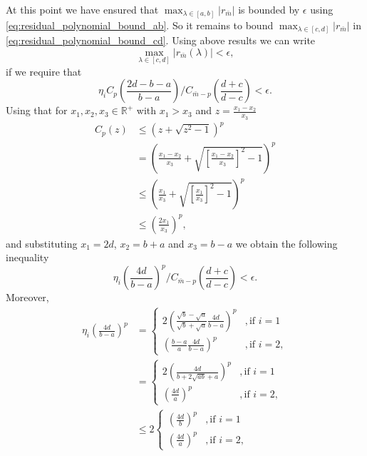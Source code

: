 At this point we have ensured that $\max_{\lambda \in [a,b]}|r_{\bar{m}}|$ is bounded by $\epsilon$ using \cref{eq:residual_polynomial_bound_ab}. So it remains to bound $\max_{\lambda \in [c,d]}|r_{\bar{m}}|$ in \cref{eq:residual_polynomial_bound_cd}. Using above results we can write 
\begin{equation*}
    \max_{\lambda \in [c,d]} |r_{\bar{m}}(\lambda)| < \epsilon,
\end{equation*}
if we require that
\begin{equation}
    \eta_i C_{p}\left(\frac{2d - b - a}{b - a}\right) /C_{\bar{m}-p}\left(\frac{d+c}{d-c}\right) < \epsilon.
    \label{eq:relative_error_bound_mp}
\end{equation}
Using that for $x_1, x_2, x_3 \in \mathbb{R}^+$ with $x_1 > x_3$ and $z = \frac{x_1 - x_2}{x_3}$
\begin{align*}
    C_p(z) & \leq \left(z + \sqrt{z^2 - 1}\right)^p \\
    & = \left( \frac{x_1 - x_2}{x_3} + \sqrt{ \left[\frac{x_1 - x_2}{x_3}\right]^2 -1}\right)^p \\
    & \leq \left( \frac{x_1}{x_3} + \sqrt{ \left[\frac{x_1}{x_3}\right]^2 - 1}\right)^p \\
    & \leq \left( \frac{2x_1}{x_3}\right)^p,
\end{align*}
and substituting $x_1 = 2d$, $x_2 = b + a$ and $x_3 = b - a$ we obtain the following inequality
\begin{equation}
    \eta_i \left(\frac{4d}{b-a} \right)^p /C_{\bar{m}-p}\left(\frac{d+c}{d-c}\right) < \epsilon. 
    \label{eq:chebyshev_degree_p_bound}
\end{equation}
Moreover,
\begin{align*}
    \eta_i \left(\frac{4d}{b-a}\right)^p &= 
    \begin{cases}
        2\left(\frac{\sqrt{b} - \sqrt{a}}{\sqrt{b} + \sqrt{a}} \frac{4d}{b-a}\right)^p &, \text{if } i = 1\\
        \left(\frac{b - a}{a}\frac{4d}{b-a}\right)^p &, \text{if } i = 2,
    \end{cases}\\
    &=
    \begin{cases}
        2\left(\frac{4d}{b + 2\sqrt{ab} + a}\right)^p &, \text{if } i = 1\\
        \left(\frac{4d}{a}\right)^p &, \text{if } i = 2,
    \end{cases}\\
    &\leq 2
    \begin{cases}
        \left(\frac{4d}{b}\right)^p &, \text{if } i = 1\\
        \left(\frac{4d}{a}\right)^p &, \text{if } i = 2,
    \end{cases}
\end{align*}

